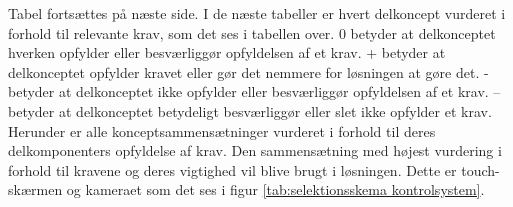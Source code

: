 Tabel fortsættes på næste side.
I de næste tabeller er hvert delkoncept vurderet i forhold til relevante krav, som det ses i tabellen over. 0 betyder at delkonceptet hverken opfylder eller besværliggør opfyldelsen af et krav. + betyder at delkonceptet opfylder kravet eller gør det nemmere for løsningen at gøre det. - betyder at delkonceptet ikke opfylder eller besværliggør opfyldelsen af et krav. -- betyder at delkonceptet betydeligt besværliggør eller slet ikke opfylder et krav.
Herunder er alle konceptsammensætninger vurderet i forhold til deres delkomponenters opfyldelse af krav. Den sammensætning med højest vurdering i forhold til kravene og deres vigtighed vil blive brugt i løsningen. Dette er touch-skærmen og kameraet som det ses i figur \ref{tab:selektionsskema kontrolsystem}.




